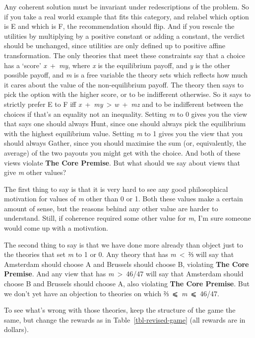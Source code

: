 \documentclass[
  10pt,
  letterpaper,
  DIV=11,
  numbers=noendperiod,
  twoside]{scrartcl}
\begin{document}
Any coherent solution must be invariant under redescriptions of the
problem. So if you take a real world example that fits this category,
and relabel which option is E and which is F, the recommendation should
flip. And if you rescale the utilities by multiplying by a positive
constant or adding a constant, the verdict should be unchanged, since
utilities are only defined up to positive affine transformation. The
only theories that meet these constraints say that a choice has a
`score' \emph{x}~+~\emph{my}, where \emph{x} is the equilibrium payoff,
and \emph{y} is the other possible payoff, and \emph{m} is a free
variable the theory sets which reflects how much it cares about the
value of the non-equilibrium payoff. The theory then says to pick the
option with the higher score, or to be indifferent otherwise. So it says
to strictly prefer E to F iff \emph{x}~+~\emph{my}~\textgreater{}
\emph{w}~+~\emph{mz} and to be indifferent between the choices if that's
an equality not an inequality. Setting \emph{m} to 0 gives you the view
that says one should always Hunt, since one should always pick the
equilibrium with the highest equilibrium value. Setting \emph{m} to 1
gives you the view that you should always Gather, since you should
maximise the sum (or, equivalently, the average) of the two payouts you
might get with the choice. And both of these views violate \textbf{The
Core Premise}. But what should we say about views that give \emph{m}
other values?

The first thing to say is that it is very hard to see any good
philosophical motivation for values of \emph{m} other than 0 or 1. Both
these values make a certain amount of sense, but the reasons behind any
other value are harder to understand. Still, if coherence required some
other value for \emph{m}, I'm sure someone would come up with a
motivation.

The second thing to say is that we have done more already than object
just to the theories that set \emph{m} to 1 or 0. Any theory that has
\emph{m}~\textless~⅔ will say that Amsterdam should choose A and
Brussels should choose B, violating \textbf{The Core Premise}. And any
view that has \emph{m}~\textgreater~46/47 will say that Amsterdam should
choose B and Brussels should choose A, also violating \textbf{The Core
Premise}. But we don't yet have an objection to theories on which
⅔~⩽~\emph{m}~⩽~46/47.

To see what's wrong with those theories, keep the structure of the game
the same, but change the rewards as in Table~\ref{tbl-revised-game} (all
rewards are in dollars).
\end{document}
